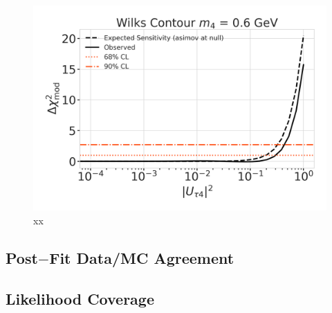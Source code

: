 
\begin{figure}[h]
    \includegraphics{figures/results/best_fit/sensitivity_and_wilks_scan_0.6_GeV_with_1sigma.png}
	\caption[xx]{xx}
\end{figure}



\subsection{Post$-$Fit Data/MC Agreement}

\subsection{Likelihood Coverage}
